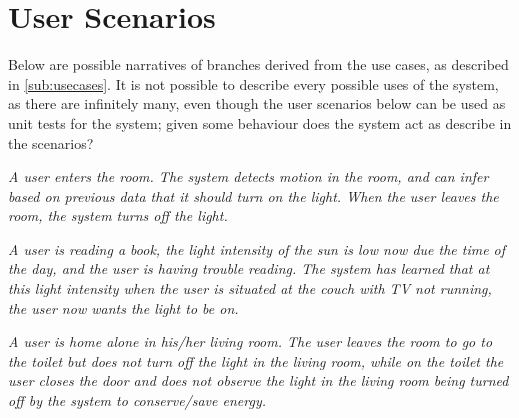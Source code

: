\section{User Scenarios}\label{sub:userscenarios}

Below are possible narratives of branches derived from the use cases, as described in \cref{sub:usecases}. It is not possible to describe every possible uses of the system, as there are infinitely many, even though the user scenarios below can be used as unit tests for the system; given some behaviour does the system act as describe in the scenarios?

\textit{A user enters the room. The system detects motion in the room, and can infer based on previous data that it should turn on the light. When the user leaves the room, the system turns off the light.}

\textit{A user is reading a book, the light intensity of the sun is low now due the time of the day, and the user is having trouble reading. The system has learned that at this light intensity when the user is situated at the couch with TV not running, the user now wants the light to be on.}

\textit{A user is home alone in his/her living room. The user leaves the room to go to the toilet but does not turn off the light in the living room, while on the toilet the user closes the door and does not observe the light in the living room being turned off by the system to conserve/save energy.}


